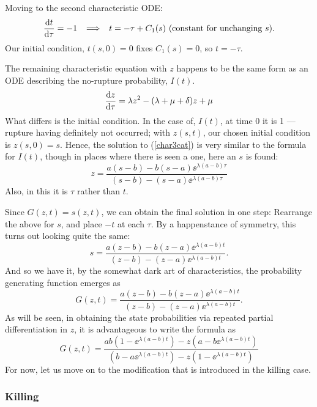 \noindent
Moving to the second characteristic ODE:
$$\displaystyle\frac{{\rm d} t}{{\rm d} \tau} = -1 \hspace{5pt} \implies \hspace{5pt} t = -\tau +  C_1(s) \text{  (constant for unchanging }s ).$$
Our initial condition, $t(s,0) = 0$ fixes $C_1(s) = 0$, so $t = -\tau$.\par
The remaining characteristic equation with $z$ happens to be the same form as an ODE describing the no-rupture probability, $I(t)$. 
\begin{equation}
\label{char3cat}
\displaystyle\frac{{\rm d} z}{{\rm d} \tau} = \lambda z^2 - (\lambda + \mu + \delta)z + \mu
\end{equation}
What differs is the initial condition. In the case of, $I(t)$, at time 0 it is 1 --- rupture having definitely not occurred; with $z(s,t)$, our chosen initial condition is $z(s, 0) = s$. Hence, the solution to (\ref{char3cat}) is very similar to the formula for $I(t)$, though in places where there is seen a one, here an $s$ is found:
\begin{equation*}
z = \frac{a(s-b) - b(s-a)\ee^{\lambda(a-b) \tau} } {(s-b) - (s-a)\ee^{\lambda(a-b) \tau}}
\end{equation*}
Also, in this it is $\tau$ rather than $t$.\par
Since $G(z, t) = s(z, t)$, we can obtain the final solution in one step: Rearrange the above for $s$, and place $-t$ at each $\tau$. By a happenstance of symmetry, this turns out looking quite the same:
\begin{equation}
\label{s2343}
s = \frac{a(z-b) - b(z-a)\ee^{\lambda(a-b) t} } {(z-b) - (z-a)\ee^{\lambda(a-b) t}}.
\end{equation}
And so we have it, by the somewhat dark art of characteristics, the probability generating function emerges as
\begin{equation*}
G(z,t) = \frac{a(z-b) - b(z-a)\ee^{\lambda(a-b) t} } {(z-b) - (z-a)\ee^{\lambda(a-b) t}}.
\end{equation*}
As will be seen, in obtaining the state probabilities via repeated partial differentiation in $z$, it is advantageous to write the formula as
\begin{equation*}
G(z,t) = \frac{ab(1-\ee^{\lambda(a-b) t}) - z(a-b\ee^{\lambda(a-b) t}) } {  (b-a\ee^{\lambda(a-b) t}) -z(1-\ee^{\lambda(a-b) t})  }
\end{equation*}
For now, let us move on to the modification that is introduced in the killing case. 


\subsubsection*{Killing}

